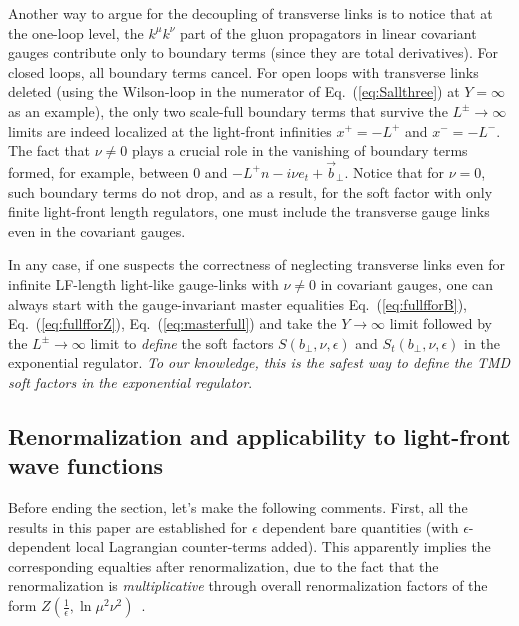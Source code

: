 \documentclass[a4paper,11pt]{article}
\begin{document}
Another way to argue for the decoupling of transverse links is to notice that at the one-loop level, the $k^{\mu}k^{\nu}$ part of the gluon propagators in linear covariant gauges contribute only to boundary terms (since they are total derivatives). For closed loops, all boundary terms cancel. For open loops with transverse links deleted (using the Wilson-loop in the numerator of Eq.~(\ref{eq:Sallthree}) at $Y=\infty$ as an example), the only two scale-full boundary terms that survive the $L^{\pm} \rightarrow \infty$ limits are indeed localized at the light-front infinities $x^+=-L^+$ and $x^-=-L^-$. The fact that $\nu \ne 0$ plays a crucial role in the vanishing of boundary terms formed, for example, between $0$ and $-L^+n-i\nu e_t+\vec{b}_\perp$. Notice that for $\nu=0$, such boundary terms do not drop, and as a result, for the soft factor with only finite light-front length regulators, one must include the transverse gauge links even in the covariant gauges. 


In any case, if one suspects the correctness of neglecting transverse links even for infinite LF-length light-like gauge-links with $\nu \ne 0$ in covariant gauges, one can always start with the gauge-invariant master equalities Eq.~(\ref{eq:fullfforB}), Eq.~(\ref{eq:fullfforZ}), Eq.~(\ref{eq:masterfull}) and take the $Y\rightarrow \infty$ limit followed by the $L^{\pm} \rightarrow \infty$ limit to {\it define} the soft factors $S(b_\perp,\nu,\epsilon)$ and $S_t(b_\perp,\nu,\epsilon)$ in the exponential regulator. {\it To our knowledge, this is the safest way to define the TMD soft factors in the exponential regulator}.  
 

\subsection{Renormalization and applicability to light-front wave functions}\label{sec:application}
Before ending the section, let's make the following comments. First, all the results in this paper are established for $\epsilon$ dependent bare quantities (with $\epsilon$-dependent local Lagrangian counter-terms added). This apparently implies the corresponding equalties after renormalization, due to the fact that the renormalization is {\it multiplicative} through overall renormalization factors of the form $Z(\frac{1}{\epsilon},\ln \mu^2\nu^2)$~\cite{Korchemskaya:1992je,Li:2016axz,Moult:2018jzp}. 
\end{document}
